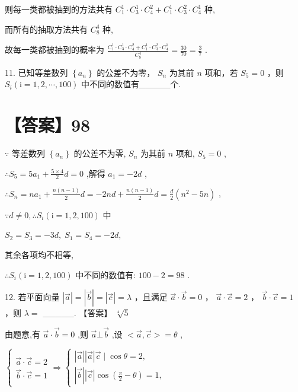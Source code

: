 \documentclass[10pt]{article}
\begin{document}
则每一类都被抽到的方法共有 \({C}_{1}^{1} \cdot  {C}_{3}^{1} \cdot  {C}_{4}^{2} + {C}_{1}^{1} \cdot  {C}_{3}^{2} \cdot  {C}_{4}^{1}\) 种,

而所有的抽取方法共有 \({C}_{8}^{4}\) 种,

故每一类都被抽到的概率为 \(\frac{{C}_{1}^{1} \cdot  {C}_{3}^{1} \cdot  {C}_{4}^{2} + {C}_{1}^{1} \cdot  {C}_{3}^{2} \cdot  {C}_{4}^{1}}{{C}_{8}^{4}} = \frac{30}{70} = \frac{3}{7}\) .

11. 已知等差数列 \(\left\{  {a}_{n}\right\}\) 的公差不为零， \({S}_{n}\) 为其前 \(n\) 项和，若 \({S}_{5} = 0\) ，则 \({S}_{i}\left( {\mathrm{i} = 1,2,\cdots ,{100}}\right)\) 中不同的数值有\_\_\_\_\_个.

\section*{【答案】98}

\(\because\) 等差数列 \(\left\{  {a}_{n}\right\}\) 的公差不为零, \({S}_{n}\) 为其前 \(n\) 项和, \({S}_{5} = 0\) ,

\(\therefore {S}_{5} = 5{a}_{1} + \frac{5 \times  4}{2}d = 0\) ,解得 \({a}_{1} =  - {2d}\) ,

\(\therefore {S}_{n} = n{a}_{1} + \frac{n\left( {n - 1}\right) }{2}d =  - {2nd} + \frac{n\left( {n - 1}\right) }{2}d = \frac{d}{2}\left( {{n}^{2} - {5n}}\right)\) ,

\(\because d \neq  0,\therefore {S}_{i}\left( {\mathrm{i} = 1,2,{100}}\right)\) 中

\({S}_{2} = {S}_{3} =  - {3d},\;{S}_{1} = {S}_{4} =  - {2d},\)

其余各项均不相等,

\(\therefore {S}_{i}\left( {\mathrm{i} = 1,2,{100}}\right)\) 中不同的数值有: \({100} - 2 = {98}\) .

12. 若平面向量 \(\left| \overrightarrow{a}\right|  = \left| \overrightarrow{b}\right|  = \left| \overrightarrow{c}\right|  = \lambda\) ，且满足 \(\overrightarrow{a} \cdot  \overrightarrow{b} = 0\) ， \(\overrightarrow{a} \cdot  \overrightarrow{c} = 2\) ， \(\overrightarrow{b} \cdot  \overrightarrow{c} = 1\) ，则 \(\lambda  =\) \_\_\_\_\_. 【答案】 \(\sqrt[4]{5}\)

由题意,有 \(\overrightarrow{a} \cdot  \overrightarrow{b} = 0\) ,则 \(\overrightarrow{a} \bot  \overrightarrow{b}\) ,设 \(< \overrightarrow{a},\overrightarrow{c} >  = \theta\) ,

\(\left\{  {\begin{array}{l} \overrightarrow{a} \cdot  \overrightarrow{c} = 2 \\  \overrightarrow{b} \cdot  \overrightarrow{c} = 1 \end{array} \Rightarrow  \left\{  \begin{array}{l} \left| \overrightarrow{a}\right| \left| \overrightarrow{a}\right| \overrightarrow{c} \mid  \cos \theta  = 2, \\  \left| \overrightarrow{b}\right| \left| \overrightarrow{c}\right| \cos \left( {\frac{\pi }{2} - \theta }\right)  = 1, \end{array}\right. }\right.\)
\end{document}
